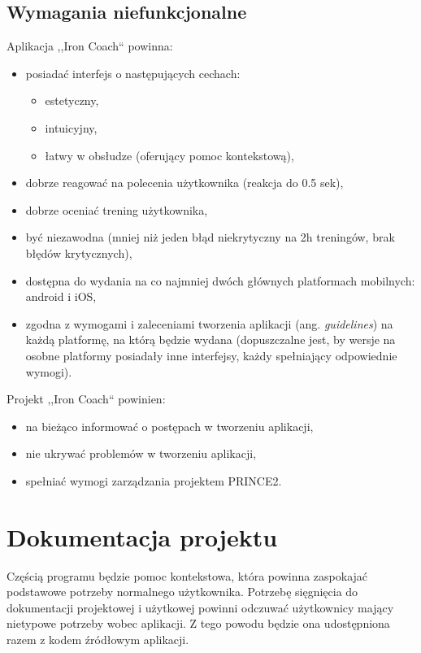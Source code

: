 \subsection{Wymagania niefunkcjonalne}
Aplikacja ,,Iron Coach`` powinna:
\begin{itemize}
  \item posiadać interfejs o następujących cechach:
    \begin{itemize}
      \item estetyczny,
      \item intuicyjny, 
      \item łatwy w obsłudze (oferujący pomoc kontekstową), 
    \end{itemize}
  \item dobrze reagować na polecenia użytkownika (reakcja do 0.5 sek),
  \item dobrze oceniać trening użytkownika,
  \item być niezawodna (mniej niż jeden błąd niekrytyczny na 2h treningów, brak błędów krytycznych),
  \item dostępna do wydania na co najmniej dwóch głównych platformach mobilnych: android i iOS,
  \item zgodna z wymogami i zaleceniami tworzenia aplikacji (ang. {\it guidelines})  na każdą platformę, na którą będzie wydana (dopuszczalne jest, by wersje na osobne platformy posiadały inne interfejsy, każdy spełniający odpowiednie wymogi).
\end{itemize}
\vspace{2pt}
Projekt ,,Iron Coach`` powinien:
\begin{itemize}
  \item na bieżąco informować o postępach w tworzeniu aplikacji,
  \item nie ukrywać problemów w tworzeniu aplikacji,
  \item spełniać wymogi zarządzania projektem PRINCE2.
\end{itemize}
\section{Dokumentacja projektu}
\noindent Częścią programu będzie pomoc kontekstowa, która powinna zaspokajać podstawowe potrzeby normalnego użytkownika. Potrzebę sięgnięcia do dokumentacji projektowej i użytkowej powinni odczuwać użytkownicy mający nietypowe potrzeby wobec aplikacji. Z tego powodu będzie ona udostępniona razem z kodem źródłowym aplikacji.
